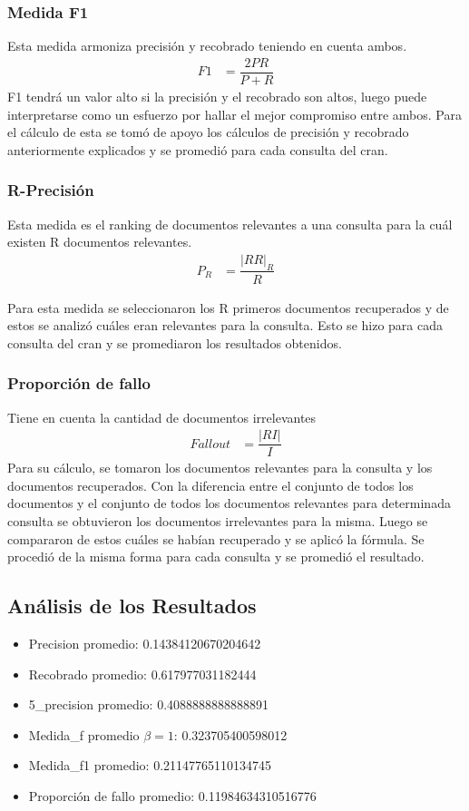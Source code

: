 \documentclass[runningheads]{llncs}
\begin{document}
\subsubsection{Medida F1}
Esta medida armoniza precisión y recobrado teniendo en cuenta ambos.
	\begin{align*}
	F1&=\dfrac{2PR}{P + R}
	\end{align*}
	F1 tendrá un valor alto si la precisión y el recobrado son altos, luego puede interpretarse como un esfuerzo por hallar el mejor compromiso entre ambos. Para el cálculo de esta se tomó de apoyo los cálculos de precisión y recobrado anteriormente explicados y se promedió para cada consulta del cran.
	
\subsubsection{R-Precisión}

Esta medida es el ranking de documentos relevantes a una consulta para la cuál existen R documentos relevantes.
	\begin{align*}
	P_{R}&=\dfrac{|RR|_{R}}{R}
	\end{align*}
	
	Para esta medida se seleccionaron los R primeros documentos recuperados y de estos se analizó cuáles eran relevantes para la consulta. Esto se hizo para cada consulta del cran y se promediaron los resultados obtenidos.

\subsubsection{Proporción de fallo}
Tiene en cuenta la cantidad de documentos irrelevantes 
	\begin{align*}
	Fallout&=\dfrac{|RI|}{I}
	\end{align*}
	Para su cálculo, se tomaron los documentos relevantes para la consulta y los documentos recuperados. Con la diferencia entre el conjunto de todos los documentos y el conjunto de todos los documentos relevantes para determinada consulta se obtuvieron los documentos irrelevantes para la misma. Luego se compararon de estos cuáles se habían recuperado y se aplicó la fórmula. Se procedió de la misma forma para cada consulta y se promedió el resultado.
\subsection{An\'alisis de los Resultados}
\begin{itemize}
\item Precision promedio:  0.14384120670204642
\item Recobrado promedio:  0.617977031182444
\item 5\_precision promedio:  0.4088888888888891
\item Medida\_f promedio  $ \beta=1 $:  0.323705400598012
\item Medida\_f1 promedio:  0.21147765110134745
\item Proporción de fallo  promedio: 0.11984634310516776

\end{itemize}
\end{document}
